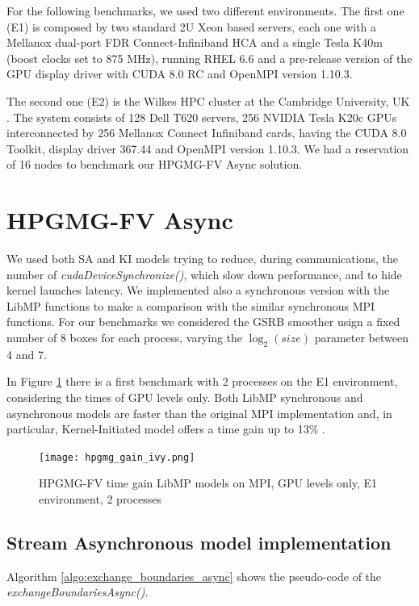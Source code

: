 \documentclass[review]{siamart1116}
\begin{document}
For the following benchmarks, we used two different environments.
The first one (E1) is composed by two standard 2U Xeon based
servers, each one with a Mellanox dual-port FDR Connect-Infiniband HCA and a single
Tesla K40m (boost clocks set to 875 MHz), running RHEL 6.6 and a
pre-release version of the GPU display driver with CUDA 8.0 RC and OpenMPI version 1.10.3.

The second one (E2) is the Wilkes HPC cluster at the Cambridge
University, UK \cite{wilkes}. The system consists of 128 Dell T620 servers, 256 NVIDIA Tesla K20c GPUs interconnected by 256 Mellanox Connect Infiniband cards, having the CUDA 8.0 Toolkit, display driver 367.44 and OpenMPI version 1.10.3. We had a reservation of 16 nodes to benchmark our HPGMG-FV Async solution.

\section{HPGMG-FV Async}\label{sec:hpgmg_async}

We used both SA and KI models trying to reduce, during communications, the number of
\textit{cudaDeviceSynchronize()}, which slow down performance, and to
hide kernel launches latency. We implemented also a synchronous
version with the LibMP functions to make a comparison with the similar synchronous MPI functions.
For our benchmarks we considered the GSRB smoother usign a fixed number of 8 boxes for each process, varying the $\log_2 (size)$ parameter between 4 and 7.

In Figure \ref{fig:hpgmg_gai_ivy} there is
a first benchmark with 2 processes on the E1 environment, considering
the times of GPU levels only. Both LibMP synchronous and asynchronous
models are faster than the original MPI implementation and, in particular,
Kernel-Initiated model offers a time gain up to 13\% .

\begin{figure}[h]
\centering
\texttt{[image: hpgmg\_gain\_ivy.png]}
\caption{HPGMG-FV time gain LibMP models on MPI, GPU levels only, E1 environment, 2 processes}
\label{fig:hpgmg_gai_ivy}
\end{figure}

\subsection{Stream Asynchronous model implementation}\label{sec:sahpgmg}

Algorithm \ref{algo:exchange_boundaries_async} shows the pseudo-code
of the \textit{exchangeBoundariesAsync()}.
\end{document}
